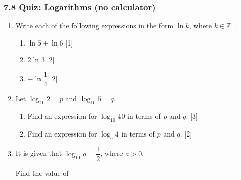 \documentclass[12pt, twoside]{article}
\begin{document}
\subsubsection*{7.8 Quiz: Logarithms (no calculator)}

\begin{enumerate}[itemsep=0.1cm]

\item[1.] [Maximum mark: 5]

Write each of the following expressions in the form $\ln k$, where
$k \in \mathbb{Z}^{+}$.

\begin{enumerate}[itemsep=0.1cm]
  \item $\ln 5 + \ln 6$ \hfill [1]
  \item $2\ln 3$ \hfill [2]
  \item $-\ln\dfrac{1}{4}$ \hfill [2]
\end{enumerate}


\medskip

\item[2.] [Maximum mark: 5]

Let $\log_{10} 2 = p$ and $\log_{10} 5 = q$.

\begin{enumerate}[itemsep=0.1cm]
  \item Find an expression for $\log_{10} 40$ in terms of $p$ and $q$.
  \hfill [3]
  \item Find an expression for $\log_{5} 4$ in terms of $p$ and $q$.
  \hfill [2]
\end{enumerate}


\newpage

\item[3.] [Maximum mark: 5]

It is given that $\log_{10} a = \dfrac{1}{2}$, where $a > 0$.

Find the value of


\end{enumerate}
\end{document}
